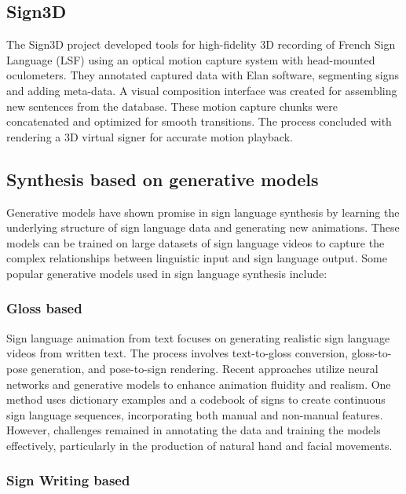 \documentclass[../../main.tex]{subfiles}
\begin{document}
\subsection{Sign3D}

The Sign3D project developed tools for high-fidelity 3D recording of French Sign Language (LSF) using an optical motion capture system with head-mounted oculometers. They annotated captured data with Elan software, segmenting signs and adding meta-data. A visual composition interface was created for assembling new sentences from the database. These motion capture chunks were concatenated and optimized for smooth transitions. The process concluded with rendering a 3D virtual signer for accurate motion playback.

\subsection{Synthesis based on generative models}

Generative models have shown promise in sign language synthesis by learning the underlying structure of sign language data and generating new animations. These models can be trained on large datasets of sign language videos to capture the complex relationships between linguistic input and sign language output. Some popular generative models used in sign language synthesis include:

\subsubsection{Gloss based}

Sign language animation from text focuses on generating realistic sign language videos from written text. The process involves text-to-gloss conversion, gloss-to-pose generation, and pose-to-sign rendering. Recent approaches utilize neural networks and generative models to enhance animation fluidity and realism. One method uses dictionary examples and a codebook of signs to create continuous sign language sequences, incorporating both manual and non-manual features\cite{Walsh2024ADR}. However, challenges remained in annotating the data and training the models effectively, particularly in the production of natural hand and facial movements.

\subsubsection{Sign Writing based}
\end{document}
